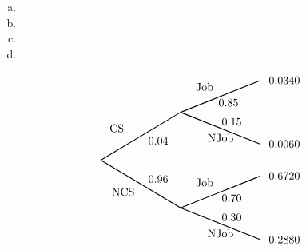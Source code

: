 \documentclass[11pt,letterpaper]{article}
\begin{document}
\sol 
\begin{enumerate}[(a)]
\item 
\item 
\item 
\item 
\end{enumerate}

		\[
		\begin{tikzpicture}[scale= 1.0]
		\def\FirstUpLabel{CS}
		\def\FirstDownLabel{NCS}
		\def\SecondUpLabel{Job}
		\def\SecondDownLabel{NJob}
		\def\Up{$0.04$}
		\def\Down{$0.96$}
		\def\UpUp{$0.85$}
		\def\UpDown{$0.15$}
		\def\DownUp{$0.70$}
		\def\DownDown{$0.30$}
		\def\first{$0.0340$}
		\def\second{$0.0060$}
		\def\third{$0.6720$}
		\def\fourth{$0.2880$}
		
		\node at (0.5,1) {\FirstUpLabel};	
		\node at (0.7,-1) {\FirstDownLabel};	
		\node at (1.8,0.6) {\Up};
		\node at (1.8,-0.6) {\Down};
		\draw[thick] (0,0) -- (2.5,1.5);
		\draw[thick] (0,0) -- (2.5,-1.5);
		
		\node at (3.25,2.3) {\SecondUpLabel};
		\node at (3.75,0.7) {\SecondDownLabel};
		\node at (4,1.8) {\UpUp};
		\node at (4.1,1.2) {\UpDown};
		\node at (5.75,2.5) {\first};
		\node at (5.75,0.5) {\second};
		\draw[thick] (2.5,1.5) -- (5,2.5);
		\draw[thick] (2.5,1.5) -- (5,0.5);

		\node at (3.25,-0.7) {\SecondUpLabel};
		\node at (3.75,-2.3) {\SecondDownLabel};
		\node at (4.1,-1.2) {\DownUp};
		\node at (4.1,-1.8) {\DownDown};
		\node at (5.75,-0.5) {\third};	
		\node at (5.75,-2.5) {\fourth};	
		\draw[thick] (2.5,-1.5) -- (5,-0.5);
		\draw[thick] (2.5,-1.5) -- (5,-2.5);
		\end{tikzpicture}
		\]
\end{document}
